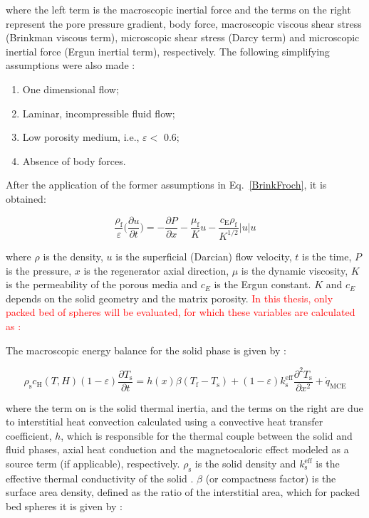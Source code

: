 \documentclass[review,preprint,12pt]{elsarticle}
\begin{document}
\noindent where the left term is the macroscopic inertial force and the terms on the right represent the pore pressure gradient, body force, macroscopic viscous shear stress (Brinkman viscous term), microscopic shear stress (Darcy term) and microscopic inertial force (Ergun inertial term), respectively. The following simplifying assumptions were also made \cite{Trevizoli2015}:

\begin{enumerate}
\item  One dimensional flow;
\item  Laminar, incompressible fluid flow;
\item  Low porosity medium, i.e., $\varepsilon <$ 0.6;
\item  Absence of body forces.
\end{enumerate}

After the application of the former assumptions in Eq.~\eqref{BrinkFroch}, it is obtained:

\begin{equation}
\frac{\rho_\textrm{f}}{\varepsilon}\Biggl(\frac{\partial u}{\partial t}\Biggr) = -\frac{\partial P}{\partial x} - \frac{\mu_\textrm{f}}{K}u - \frac{c_\textrm{E}\rho_\textrm{f}}{K^{1/2}}|u|u
\label{BrinkFrochSimplified}
\end{equation}

\noindent where $\rho$ is the density, $u$ is the superficial (Darcian) flow velocity, $t$ is the time, $P$ is the pressure, $x$ is the regenerator axial direction, $\mu$ is the dynamic viscosity, $K$ is the permeability of the porous media and $c_{E}$ is the Ergun constant. $K$ and $c_{E}$ depends on the solid geometry and the matrix  porosity. \textcolor{red}{In this thesis, only packed bed of spheres will be evaluated, for which these variables are calculated as \cite{Ergun1952}:}


The macroscopic energy balance for the solid phase is given by \cite{Engelbrecht2004,Trevizoli2015}:

\begin{equation}
\rho_\textrm{s} c_\textrm{H}(T,H)(1-\varepsilon)\frac{\partial T_\textrm{s}}{\partial t} = h(x) \beta (T_\textrm{f}-T_\textrm{s}) + (1-\varepsilon)k^\textrm{eff}_\textrm{s}\frac{\partial^{2} T_\textrm{s}}{\partial x^{2}} + \dot{q}_\textrm{MCE}
\label{SolidEnergyEquation}
\end{equation}

\noindent where the term on is the solid thermal inertia, and the terms on the right are due to interstitial heat convection calculated using a convective heat transfer coefficient, $h$, which is responsible for the thermal couple between the solid and fluid phases, axial heat conduction and the magnetocaloric effect modeled as a source term (if applicable), respectively. $\rho_\textrm{s}$ is the solid density and $k^\textrm{eff}_\textrm{s}$ is the effective thermal conductivity of the solid \cite{Kaviany1995,Nield2006}. $\beta$ (or compactness factor) is the surface area density, defined as the ratio of the interstitial area, which for packed bed spheres it is given by \cite{Kaviany1995}:
\end{document}

